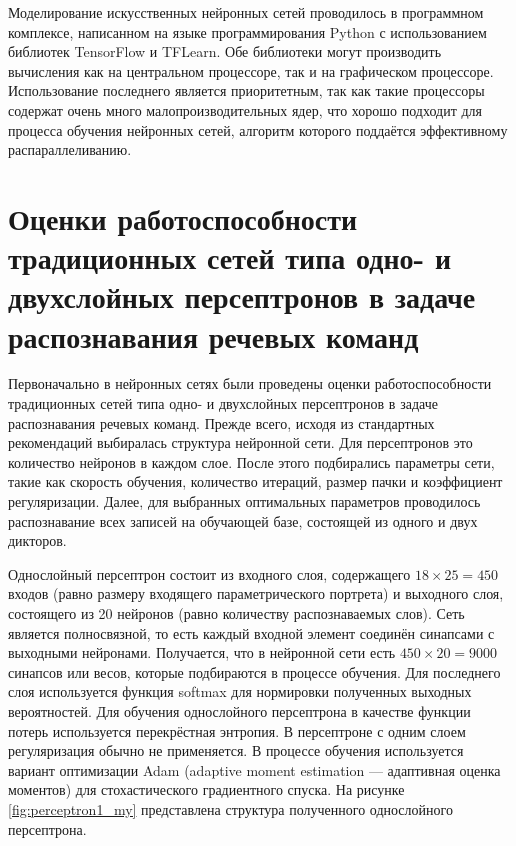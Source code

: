 Моделирование искусственных нейронных сетей проводилось в программном комплексе, написанном на языке программирования Python с использованием библиотек TensorFlow и TFLearn.
Обе библиотеки могут производить вычисления как на центральном процессоре, так и на графическом процессоре.
Использование последнего является приоритетным, так как такие процессоры содержат очень много малопроизводительных ядер, что хорошо подходит для процесса обучения нейронных сетей, алгоритм которого поддаётся эффективному распараллеливанию.


\section{Оценки работоспособности традиционных сетей типа одно- и двухслойных персептронов в задаче распознавания речевых команд} \label{sect4_1}

Первоначально в нейронных сетях были проведены оценки работоспособности традиционных сетей типа одно- и двухслойных персептронов в задаче распознавания речевых команд.
Прежде всего, исходя из стандартных рекомендаций выбиралась структура нейронной сети.
Для персептронов это количество нейронов в каждом слое.
После этого подбирались параметры сети, такие как скорость обучения, количество итераций, размер пачки и коэффициент регуляризации.
Далее, для выбранных оптимальных параметров проводилось распознавание всех записей на обучающей базе, состоящей из одного и двух дикторов.

Однослойный персептрон состоит из входного слоя, содержащего $18 \times 25 = 450$ входов (равно размеру входящего параметрического портрета) и выходного слоя, состоящего из 20 нейронов (равно количеству распознаваемых слов).
Сеть является полносвязной, то есть каждый входной элемент соединён синапсами с выходными нейронами.
Получается, что в нейронной сети есть $450 \times 20 = 9000$ синапсов или весов, которые подбираются в процессе обучения.
Для последнего слоя используется функция softmax для нормировки полученных выходных вероятностей.
Для обучения однослойного персептрона в качестве функции потерь используется перекрёстная энтропия.
В персептроне с одним слоем регуляризация обычно не применяется.
В процессе обучения используется вариант оптимизации Adam (adaptive moment estimation --- адаптивная оценка моментов) для стохастического градиентного спуска.
На рисунке \ref{fig:perceptron1_my} представлена структура полученного однослойного персептрона.

